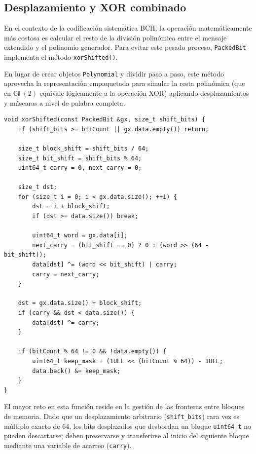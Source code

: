 \subsection{Desplazamiento y XOR combinado}

En el contexto de la codificación sistemática BCH, la operación matemáticamente más costosa es calcular el resto de la división polinómica entre el mensaje extendido y el polinomio generador. Para evitar este pesado proceso, \texttt{PackedBit} implementa el método \texttt{xorShifted()}.

En lugar de crear objetos \texttt{Polynomial} y dividir paso a paso, este método aprovecha la representación empaquetada para simular la resta polinómica (que en $\mathbb{GF}(2)$ equivale lógicamente a la operación XOR) aplicando desplazamientos y máscaras a nivel de palabra completa.

\begin{lstlisting}[style=CodigoCPP, caption={Implementación del método \texttt{xorShifted}, responsable de aplicar la operación XOR con un vector desplazado a nivel de bloques de 64 bits.}, label={lst:packedbit_xorshifted}]
void xorShifted(const PackedBit &gx, size_t shift_bits) {
    if (shift_bits >= bitCount || gx.data.empty()) return;

    size_t block_shift = shift_bits / 64;
    size_t bit_shift = shift_bits % 64;
    uint64_t carry = 0, next_carry = 0;
    
    size_t dst;
    for (size_t i = 0; i < gx.data.size(); ++i) {
        dst = i + block_shift;
        if (dst >= data.size()) break;

        uint64_t word = gx.data[i];
        next_carry = (bit_shift == 0) ? 0 : (word >> (64 - bit_shift));
        data[dst] ^= (word << bit_shift) | carry;
        carry = next_carry;
    }

    dst = gx.data.size() + block_shift;
    if (carry && dst < data.size()) {
        data[dst] ^= carry;
    }

    if (bitCount % 64 != 0 && !data.empty()) {
        uint64_t keep_mask = (1ULL << (bitCount % 64)) - 1ULL;
        data.back() &= keep_mask;
    }
}
\end{lstlisting}

El mayor reto en esta función reside en la gestión de las fronteras entre bloques de memoria. Dado que un desplazamiento arbitrario (\texttt{shift\_bits}) rara vez es múltiplo exacto de 64, los bits desplazados que desbordan un bloque \texttt{uint64\_t} no pueden descartarse; deben preservarse y transferirse al inicio del siguiente bloque mediante una variable de acarreo (\texttt{carry}).

